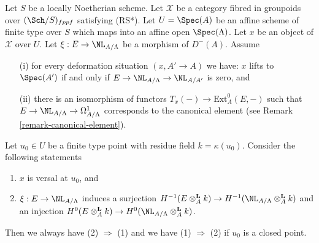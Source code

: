 \begin{lemma}
\label{lemma-characterize-versal}
Let $S$ be a locally Noetherian scheme. Let $\mathcal{X}$ be a category
fibred in groupoids over $(\Sch/S)_{fppf}$ satisfying (RS*).
Let $U = \Spec(A)$ be an
affine scheme of finite type over $S$ which maps into an affine open
$\Spec(\Lambda)$. Let $x$ be an object of $\mathcal{X}$ over $U$.
Let $\xi : E \to \NL_{A/\Lambda}$ be a morphism of $D^{-}(A)$. Assume
\begin{enumerate}
\item[(i)] for every deformation situation $(x, A' \to A)$ we have:
$x$ lifts to $\Spec(A')$ if and only if
$E \to \NL_{A/\Lambda} \to \NL_{A/A'}$ is zero, and
\item[(ii)] there is an isomorphism of functors
$T_x(-) \to \text{Ext}^0_A(E, -)$
such that $E \to \NL_{A/\Lambda} \to \Omega^1_{A/\Lambda}$
corresponds to the canonical element (see
Remark \ref{remark-canonical-element}).
\end{enumerate}
Let $u_0 \in U$ be a finite type point with residue field
$k = \kappa(u_0)$. Consider the following statements
\begin{enumerate}
\item $x$ is versal at $u_0$, and
\item $\xi : E \to \NL_{A/\Lambda}$ induces a surjection
$H^{-1}(E \otimes_A^{\mathbf{L}} k) \to
H^{-1}(\NL_{A/\Lambda} \otimes_A^{\mathbf{L}} k)$
and an injection
$H^0(E \otimes_A^{\mathbf{L}} k) \to
H^0(\NL_{A/\Lambda} \otimes_A^{\mathbf{L}} k)$.
\end{enumerate}
Then we always have (2) $\Rightarrow$ (1) and we have (1) $\Rightarrow$ (2)
if $u_0$ is a closed point.
\end{lemma}

